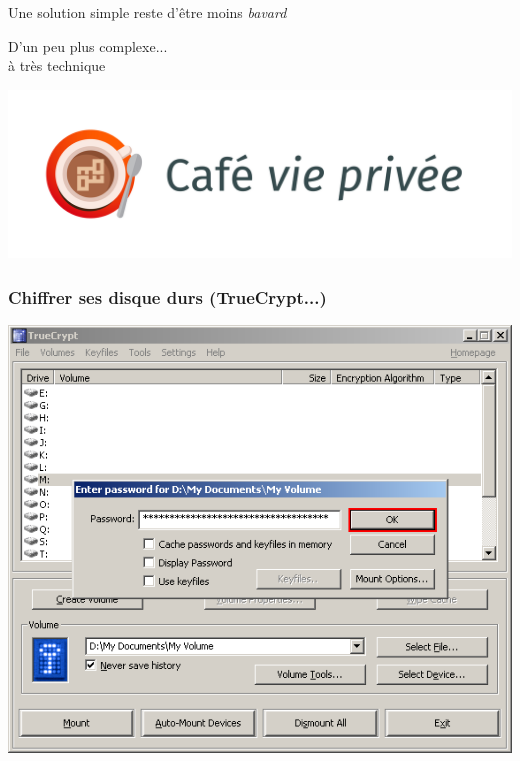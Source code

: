 \documentclass{beamer}
\begin{document}
\begin{frame}
\begin{center}
\Huge{Une solution simple reste d'être moins \emph{bavard}}
\end{center}
\end{frame}

\begin{frame}
\begin{center}
\Huge{D'un peu plus complexe...\\ à très technique}
\end{center}
\end{frame}

\begin{frame}
\begin{center}
\includegraphics[scale=0.4] {./images/LogoCafeViePrivee.jpg}
\end{center}

\end{frame}

\begin{frame}
\frametitle{Chiffrer ses disque durs (TrueCrypt...)}
\begin{center}
\includegraphics[scale=0.4] {./images/Truecrypt18.png}
\end{center}
\end{frame}
\end{document}
